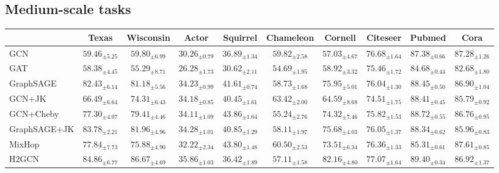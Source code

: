 \documentclass[final,5p,times,twocolumn]{elsarticle}
\begin{document}
\subsection{Medium-scale tasks}
\label{sec:experiments-medium}



\begin{table*}
	\centering
\begingroup
	\setlength{\tabcolsep}{4pt}
	\begin{tabular}{lccccccccc}
		\toprule
		& \textbf{Texas} & \textbf{Wisconsin} & \textbf{Actor} & \textbf{Squirrel} & \textbf{Chameleon} & \textbf{Cornell} & \textbf{Citeseer} & \textbf{Pubmed} & \textbf{Cora} \\
		\midrule
		GCN & $59.46_{\pm 5.25}$ & $59.80_{\pm 6.99}$ & $30.26_{\pm 0.79}$ & $36.89_{\pm 1.34}$ & $59.82_{\pm 2.58}$ & $57.03_{\pm 4.67}$ & $\mathbf{76.68}_{\pm 1.64}$ & $87.38_{\pm 0.66}$ & $\mathbf{87.28}_{\pm 1.26}$ \\
		GAT & $58.38_{\pm 4.45}$ & $55.29_{\pm 8.71}$ & $26.28_{\pm 1.73}$ & $30.62_{\pm 2.11}$ & $54.69_{\pm 1.95}$ & $58.92_{\pm 3.32}$ & $\mathbf{75.46}_{\pm 1.72}$ & $84.68_{\pm 0.44}$ & $82.68_{\pm 1.80}$ \\
		GraphSAGE & $\mathbf{82.43}_{\pm 6.14}$ & $81.18_{\pm 5.56}$ & $34.23_{\pm 0.99}$ & $41.61_{\pm 0.74}$ & $58.73_{\pm 1.68}$ & $75.95_{\pm 5.01}$ & $\mathbf{76.04}_{\pm 1.30}$ & $88.45_{\pm 0.50}$ & $\mathbf{86.90}_{\pm 1.04}$ \\
		\midrule
		GCN+JK & $66.49_{\pm 6.64}$ & $74.31_{\pm 6.43}$ & $34.18_{\pm 0.85}$ & $40.45_{\pm 1.61}$ & $63.42_{\pm 2.00}$ & $64.59_{\pm 8.68}$ & $74.51_{\pm 1.75}$ & $88.41_{\pm 0.45}$ & $85.79_{\pm 0.92}$ \\
		GCN+Cheby & $77.30_{\pm 4.07}$ & $79.41_{\pm 4.46}$ & $34.11_{\pm 1.09}$ & $43.86_{\pm 1.64}$ & $55.24_{\pm 2.76}$ & $74.32_{\pm 7.46}$ & $\mathbf{75.82}_{\pm 1.53}$ & $88.72_{\pm 0.55}$ & $\mathbf{86.76}_{\pm 0.95}$ \\
		GraphSAGE+JK & $\mathbf{83.78}_{\pm 2.21}$ & $81.96_{\pm 4.96}$ & $34.28_{\pm 1.01}$ & $40.85_{\pm 1.29}$ & $58.11_{\pm 1.97}$ & $75.68_{\pm 4.03}$ & $\mathbf{76.05}_{\pm 1.37}$ & $88.34_{\pm 0.62}$ & $85.96_{\pm 0.83}$ \\
		\midrule
		MixHop & $77.84_{\pm 7.73}$ & $75.88_{\pm 4.90}$ & $32.22_{\pm 2.34}$ & $43.80_{\pm 1.48}$ & $60.50_{\pm 2.53}$ & $73.51_{\pm 6.34}$ & $\mathbf{76.36}_{\pm 1.33}$ & $85.31_{\pm 0.61}$ & $\mathbf{87.61}_{\pm 0.85}$ \\
		H2GCN & $\mathbf{84.86}_{\pm 6.77}$ & $\mathbf{86.67}_{\pm 4.69}$ & $\mathbf{35.86}_{\pm 1.03}$ & $36.42_{\pm 1.89}$ & $57.11_{\pm 1.58}$ & $\mathbf{82.16}_{\pm 4.80}$ & $\mathbf{77.07}_{\pm 1.64}$ & $\mathbf{89.40}_{\pm 0.34}$ & $\mathbf{86.92}_{\pm 1.37}$ \\

\end{tabular}
\end{table*}
\end{document}
